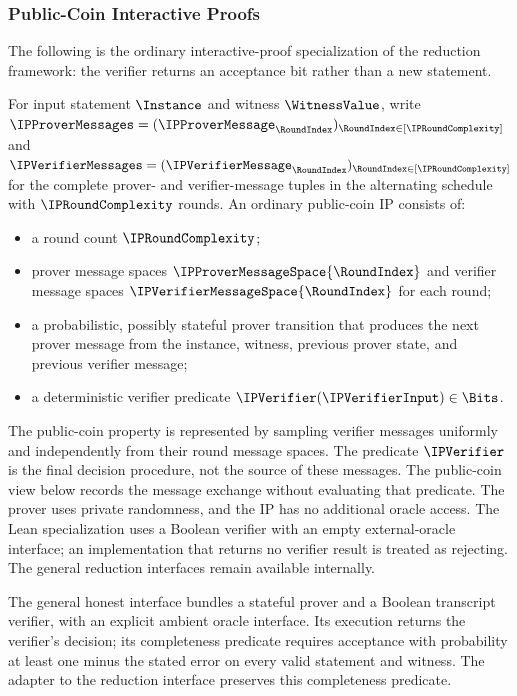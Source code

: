 \subsubsection{Public-Coin Interactive Proofs}

The following is the ordinary interactive-proof specialization of the reduction
framework: the verifier returns an acceptance bit rather than a new statement.

\begin{definition}
\label{def:public_coin_ip_structure}
For input statement \(\Instance\) and witness \(\WitnessValue\), write \(\IPProverMessages=(\IPProverMessage_{\RoundIndex})_{\RoundIndex\in[\IPRoundComplexity]}\) and \(\IPVerifierMessages=(\IPVerifierMessage_{\RoundIndex})_{\RoundIndex\in[\IPRoundComplexity]}\) for the complete prover- and verifier-message tuples in the alternating schedule with \(\IPRoundComplexity\) rounds. An ordinary public-coin IP consists of:
\begin{itemize}
\item a round count \(\IPRoundComplexity\);
\item prover message spaces
\(\IPProverMessageSpace{\RoundIndex}\) and verifier message spaces
\(\IPVerifierMessageSpace{\RoundIndex}\) for each round;
\item a probabilistic, possibly stateful prover transition that produces the next prover
message from the instance, witness, previous prover state, and previous
verifier message;
\item a deterministic verifier predicate
\(\IPVerifier(\IPVerifierInput)\in\Bits\).
\end{itemize}
The public-coin property is represented by sampling verifier messages
uniformly and independently from their round message spaces.
The predicate \(\IPVerifier\) is the final decision procedure, not the source
of these messages. The public-coin view below records the message exchange
without evaluating that predicate.
The prover uses private randomness, and the IP has no additional oracle access.
The Lean specialization uses a Boolean verifier with an empty external-oracle
interface; an implementation that returns no verifier result is treated as rejecting.
The general reduction interfaces remain available internally.
\leanok
\end{definition}

\begin{remark}
\label{rem:honest_protocol_interface}
The general honest interface bundles a stateful prover and a Boolean transcript verifier,
with an explicit ambient oracle interface. Its execution returns the verifier's decision;
its completeness predicate requires acceptance with probability at least one minus the
stated error on every valid statement and witness. The adapter to the reduction interface
preserves this completeness predicate.
\leanok
\end{remark}


